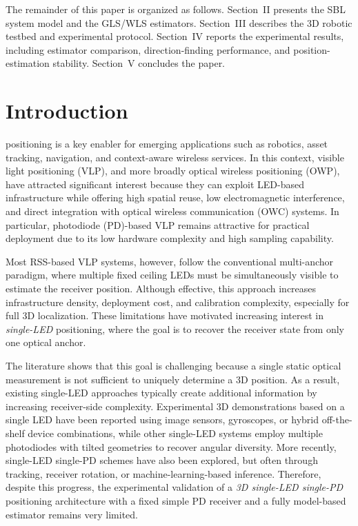 The remainder of this paper is organized as follows. Section~II presents the SBL system model and the GLS/WLS estimators. Section~III describes the 3D robotic testbed and experimental protocol. Section~IV reports the experimental results, including estimator comparison, direction-finding performance, and position-estimation stability. Section~V concludes the paper.











\section{Introduction}
\label{sec:intro}

 positioning is a key enabler for emerging applications such as robotics, asset tracking, navigation, and context-aware wireless services. In this context, visible light positioning (VLP), and more broadly optical wireless positioning (OWP), have attracted significant interest because they can exploit LED-based infrastructure while offering high spatial reuse, low electromagnetic interference, and direct integration with optical wireless communication (OWC) systems. In particular, photodiode (PD)-based VLP remains attractive for practical deployment due to its low hardware complexity and high sampling capability.

Most RSS-based VLP systems, however, follow the conventional multi-anchor paradigm, where multiple fixed ceiling LEDs must be simultaneously visible to estimate the receiver position. Although effective, this approach increases infrastructure density, deployment cost, and calibration complexity, especially for full 3D localization. These limitations have motivated increasing interest in \emph{single-LED} positioning, where the goal is to recover the receiver state from only one optical anchor.

The literature shows that this goal is challenging because a single static optical measurement is not sufficient to uniquely determine a 3D position. As a result, existing single-LED approaches typically create additional information by increasing receiver-side complexity. Experimental 3D demonstrations based on a single LED have been reported using image sensors, gyroscopes, or hybrid off-the-shelf device combinations, while other single-LED systems employ multiple photodiodes with tilted geometries to recover angular diversity. More recently, single-LED single-PD schemes have also been explored, but often through tracking, receiver rotation, or machine-learning-based inference. Therefore, despite this progress, the experimental validation of a \emph{3D single-LED single-PD} positioning architecture with a fixed simple PD receiver and a fully model-based estimator remains very limited.

